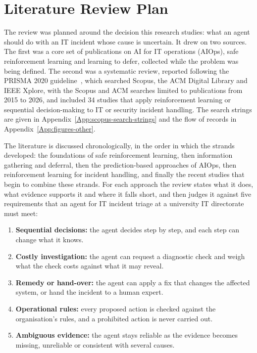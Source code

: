 \section{Literature Review Plan}
\label{ch02:sec:plan}

The review was planned around the decision this research studies: what an agent should do with an IT incident whose cause is uncertain. It drew on two sources. The first was a core set of publications on AI for IT operations (AIOps), safe reinforcement learning and learning to defer, collected while the problem was being defined. The second was a systematic review, reported following the PRISMA 2020 guideline~\cite{page2021}, which searched Scopus, the ACM Digital Library and IEEE Xplore, with the Scopus and ACM searches limited to publications from 2015 to 2026, and included 34 studies that apply reinforcement learning or sequential decision-making to IT or security incident handling. The search strings are given in Appendix~\ref{App:scopus-search-strings} and the flow of records in Appendix~\ref{App:figures-other}.

The literature is discussed chronologically, in the order in which the strands developed: the foundations of safe reinforcement learning, then information gathering and deferral, then the prediction-based approaches of AIOps, then reinforcement learning for incident handling, and finally the recent studies that begin to combine these strands. For each approach the review states what it does, what evidence supports it and where it falls short, and then judges it against five requirements that an agent for IT incident triage at a university IT directorate must meet:

\begin{enumerate}[label=\textbf{R\arabic*.}]
\item \textbf{Sequential decisions:} the agent decides step by step, and each step can change what it knows.
\item \textbf{Costly investigation:} the agent can request a diagnostic check and weigh what the check costs against what it may reveal.
\item \textbf{Remedy or hand-over:} the agent can apply a fix that changes the affected system, or hand the incident to a human expert.
\item \textbf{Operational rules:} every proposed action is checked against the organisation's rules, and a prohibited action is never carried out.
\item \textbf{Ambiguous evidence:} the agent stays reliable as the evidence becomes missing, unreliable or consistent with several causes.
\end{enumerate}


